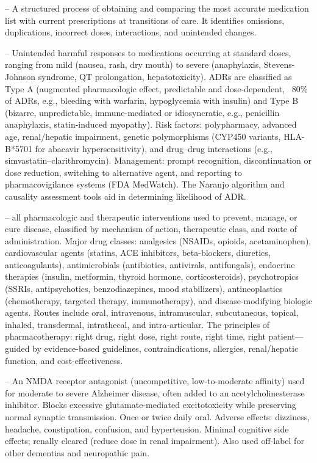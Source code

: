 -- A structured process of obtaining and comparing the most accurate medication list with current prescriptions at transitions of care. It identifies omissions, duplications, incorrect doses, interactions, and unintended changes.

-- Unintended harmful responses to medications occurring at standard doses, ranging from mild (nausea, rash, dry mouth) to severe (anaphylaxis, Stevens-Johnson syndrome, QT prolongation, hepatotoxicity). ADRs are classified as Type A (augmented pharmacologic effect, predictable and dose-dependent, ~80\% of ADRs, e.g., bleeding with warfarin, hypoglycemia with insulin) and Type B (bizarre, unpredictable, immune-mediated or idiosyncratic, e.g., penicillin anaphylaxis, statin-induced myopathy). Risk factors: polypharmacy, advanced age, renal/hepatic impairment, genetic polymorphisms (CYP450 variants, HLA-B*5701 for abacavir hypersensitivity), and drug--drug interactions (e.g., simvastatin--clarithromycin). Management: prompt recognition, discontinuation or dose reduction, switching to alternative agent, and reporting to pharmacovigilance systems (FDA MedWatch). The Naranjo algorithm and causality assessment tools aid in determining likelihood of ADR.

-- all pharmacologic and therapeutic interventions used to prevent, manage, or cure disease, classified by mechanism of action, therapeutic class, and route of administration. Major drug classes: analgesics (NSAIDs, opioids, acetaminophen), cardiovascular agents (statins, ACE inhibitors, beta-blockers, diuretics, anticoagulants), antimicrobials (antibiotics, antivirals, antifungals), endocrine therapies (insulin, metformin, thyroid hormone, corticosteroids), psychotropics (SSRIs, antipsychotics, benzodiazepines, mood stabilizers), antineoplastics (chemotherapy, targeted therapy, immunotherapy), and disease-modifying biologic agents. Routes include oral, intravenous, intramuscular, subcutaneous, topical, inhaled, transdermal, intrathecal, and intra-articular. The principles of pharmacotherapy: right drug, right dose, right route, right time, right patient—guided by evidence-based guidelines, contraindications, allergies, renal/hepatic function, and cost-effectiveness.

-- An NMDA receptor antagonist (uncompetitive, low-to-moderate affinity) used for moderate to severe Alzheimer disease, often added to an acetylcholinesterase inhibitor. Blocks excessive glutamate-mediated excitotoxicity while preserving normal synaptic transmission. Once or twice daily oral. Adverse effects: dizziness, headache, constipation, confusion, and hypertension. Minimal cognitive side effects; renally cleared (reduce dose in renal impairment). Also used off-label for other dementias and neuropathic pain.

